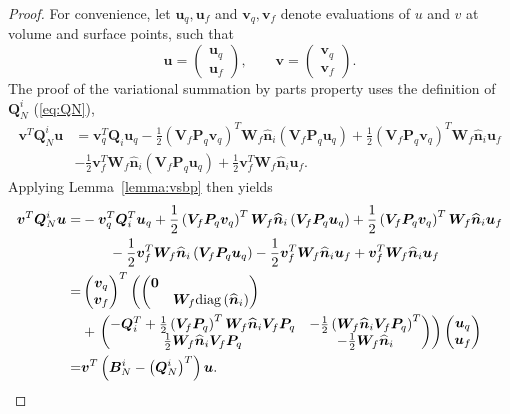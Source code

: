 \documentclass[review]{siamart0216}
\theoremstyle{assumption}
\renewcommand{\hat}[1]{\hat{#1}}
\newcommand{\LRp}[1]{\left( #1 \right)}
\renewcommand{\hat}{\widehat}
\newcommand{\diag}[1]{{\rm diag}\LRp{#1}}
\begin{document}
\begin{proof}
For convenience, let $\bm{u}_q, \bm{u}_f$ and $\bm{v}_q, \bm{v}_f$ denote evaluations of $u$ and $v$ at volume and surface points, such that 
\[
\bm{u} = \begin{pmatrix} \bm{u}_q\\ \bm{u}_f\end{pmatrix}, \qquad \bm{v} = \begin{pmatrix} \bm{v}_q\\ \bm{v}_f\end{pmatrix}.  
\]
The proof of the variational summation by parts property uses the definition of $\bm{Q}^i_N$ (\ref{eq:QN}), 
\begin{align*}
\bm{v}^T\bm{Q}^i_N\bm{u} &= \bm{v}_q^T\bm{Q}_i \bm{u}_q - \frac{1}{2}\LRp{\bm{V}_f\bm{P}_q\bm{v}_q}^T\bm{W}_f\hat{\bm{n}}_i \LRp{\bm{V}_f\bm{P}_q\bm{u}_q} + \frac{1}{2}\LRp{\bm{V}_f\bm{P}_q\bm{v}_q}^T\bm{W}_f\hat{\bm{n}}_i \bm{u}_f\\
& - \frac{1}{2}\bm{v}_f^T\bm{W}_f\hat{\bm{n}}_i \LRp{\bm{V}_f\bm{P}_q\bm{u}_q} + \frac{1}{2}\bm{v}_f^T\bm{W}_f\hat{\bm{n}}_i \bm{u}_f.
\end{align*}
Applying Lemma~\ref{lemma:vsbp} then yields
\begin{align*}
\bm{v}^T\bm{Q}^i_N\bm{u} =& -\bm{v}_q^T\bm{Q}^T_i \bm{u}_q + \frac{1}{2}\LRp{\bm{V}_f\bm{P}_q\bm{v}_q}^T\bm{W}_f\hat{\bm{n}}_i \LRp{\bm{V}_f\bm{P}_q\bm{u}_q} + \frac{1}{2}\LRp{\bm{V}_f\bm{P}_q\bm{v}_q}^T\bm{W}_f\hat{\bm{n}}_i \bm{u}_f\\
&\qquad - \frac{1}{2}\bm{v}_f^T\bm{W}_f\hat{\bm{n}}_i \LRp{\bm{V}_f\bm{P}_q\bm{u}_q} - \frac{1}{2}\bm{v}_f^T\bm{W}_f\hat{\bm{n}}_i \bm{u}_f + \bm{v}_f^T\bm{W}_f\hat{\bm{n}}_i \bm{u}_f\\
=& \begin{pmatrix} \bm{v}_q\\ \bm{v}_f\end{pmatrix}^T 
\left(\begin{pmatrix}
\bm{0}& \\
& \bm{W}_f\diag{\hat{\bm{n}}_i}
\end{pmatrix}\right.\\
&+
\left.\begin{pmatrix}
-\bm{Q}_i^T + \frac{1}{2}\LRp{\bm{V}_f\bm{P}_q}^T\bm{W}_f\hat{\bm{n}}_i \bm{V}_f\bm{P}_q & -\frac{1}{2} \LRp{\bm{W}_f\hat{\bm{n}}_i \bm{V}_f\bm{P}_q}^T\\
\frac{1}{2}\bm{W}_f\hat{\bm{n}}_i \bm{V}_f\bm{P}_q & -\frac{1}{2}\bm{W}_f\hat{\bm{n}}_i
\end{pmatrix}  \right)
\begin{pmatrix} \bm{u}_q\\ \bm{u}_f\end{pmatrix}\\
=& \bm{v}^T\LRp{\bm{B}^i_N - \LRp{\bm{Q}^i_N}^T}\bm{u}.
\end{align*}
\end{proof}
\end{document}
